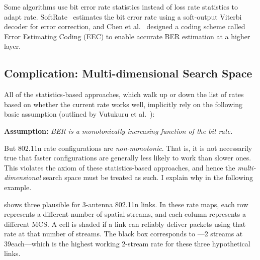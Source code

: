 Some algorithms use bit error rate statistics instead of loss rate statistics to adapt rate. SoftRate~\cite{Vutukuru_SoftRate} estimates the bit error rate using a soft-output Viterbi decoder for error correction, and Chen et al.~\cite{Chen_EEC} designed a coding scheme called Error Estimating Coding (EEC) to enable accurate BER estimation at a higher layer.

\subsection{Complication: Multi-dimensional Search Space} 
All of the statistics-based approaches, which walk up or down the list of rates based on whether the current rate works well, implicitly rely on the following basic assumption (outlined by Vutukuru et al.~\cite{Vutukuru_SoftRate}):
\begin{center}
\textbf{Assumption:} \emph{BER is a monotonically increasing function of the bit rate.}
\end{center}
But 802.11n rate configurations are \emph{non-monotonic}. That is, it is not necessarily true that faster configurations are generally less likely to work than slower ones. This violates the axiom of these statistics-based approaches, and hence the \emph{multi-dimensional} search space must be treated as such. I explain why in the following example.

 shows three plausible  for 3-antenna 802.11n links. In these rate maps, each row represents a different number of spatial streams, and each column represents a different MCS. A cell is shaded if a link can reliably deliver packets using that rate at that number of streams. The black box corresponds to ---2 streams at 39\Mbps each---which is the highest working 2-stream rate for these three hypothetical links.

